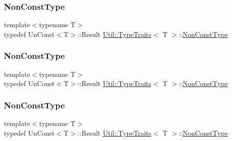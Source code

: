 \subsubsection{\texorpdfstring{NonConstType}{NonConstType}\hspace{0.1cm}{\footnotesize\ttfamily [1/3]}}
{\footnotesize\ttfamily template$<$typename T$>$ \\
typedef Un\+Const$<$T$>$\+::Result \mbox{\hyperlink{classUtil_1_1TypeTraits}{Util\+::\+Type\+Traits}}$<$ T $>$\+::\mbox{\hyperlink{classUtil_1_1TypeTraits_a4fd9a7bd65b33d0ac3e035024ff0d8f0}{Non\+Const\+Type}}}

\mbox{\label{classUtil_1_1TypeTraits_a4fd9a7bd65b33d0ac3e035024ff0d8f0}} 
\subsubsection{\texorpdfstring{NonConstType}{NonConstType}\hspace{0.1cm}{\footnotesize\ttfamily [2/3]}}
{\footnotesize\ttfamily template$<$typename T$>$ \\
typedef Un\+Const$<$T$>$\+::Result \mbox{\hyperlink{classUtil_1_1TypeTraits}{Util\+::\+Type\+Traits}}$<$ T $>$\+::\mbox{\hyperlink{classUtil_1_1TypeTraits_a4fd9a7bd65b33d0ac3e035024ff0d8f0}{Non\+Const\+Type}}}

\mbox{\label{classUtil_1_1TypeTraits_a4fd9a7bd65b33d0ac3e035024ff0d8f0}} 
\subsubsection{\texorpdfstring{NonConstType}{NonConstType}\hspace{0.1cm}{\footnotesize\ttfamily [3/3]}}
{\footnotesize\ttfamily template$<$typename T$>$ \\
typedef Un\+Const$<$T$>$\+::Result \mbox{\hyperlink{classUtil_1_1TypeTraits}{Util\+::\+Type\+Traits}}$<$ T $>$\+::\mbox{\hyperlink{classUtil_1_1TypeTraits_a4fd9a7bd65b33d0ac3e035024ff0d8f0}{Non\+Const\+Type}}}

\mbox{\label{classUtil_1_1TypeTraits_a8ffbb0166d5a321e021ac2171f2d4981}} 

